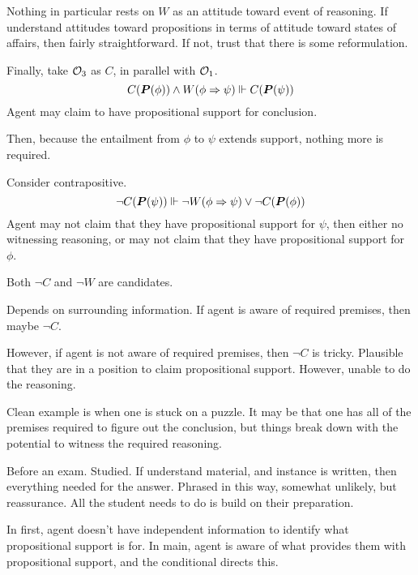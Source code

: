 \begin{note}[\(W\) is an attitude?]
  Nothing in particular rests on \(W\) as an attitude toward event of reasoning.
  If understand attitudes toward propositions in terms of attitude toward states of affairs, then fairly straightforward.
  If not, trust that there is some reformulation.
\end{note}

\begin{note}[\(\geop{3}\)]
  Finally, take \(\geop{3}\) as \(C\), in parallel with \(\mathcal{O}_{1}\).
  \[C(\bm{P}(\phi)) \land W(\phi \Rightarrow{} \psi) \Vdash C(\bm{P}(\psi))\]
  Agent may claim to have propositional support for conclusion.
\end{note}

\begin{note}[Contraposing]
  Then, because the entailment from \(\phi\) to \(\psi\) extends support, nothing more is required.

  Consider contrapositive.
  \[\lnot C(\bm{P}(\psi)) \Vdash  \lnot W(\phi \Rightarrow{} \psi) \lor \lnot C(\bm{P}(\phi))\]
  Agent may not claim that they have propositional support for \(\psi\), then either no witnessing reasoning, or may not claim that they have propositional support for \(\phi\).

  Both \(\lnot C\) and \(\lnot W\) are candidates.

  Depends on surrounding information.
  If agent is aware of required premises, then maybe \(\lnot C\).

  However, if agent is not aware of required premises, then \(\lnot C\) is tricky.
  Plausible that they are in a position to claim propositional support.
  However, unable to do the reasoning.

  Clean example is when one is stuck on a puzzle.
  It may be that one has all of the premises required to figure out the conclusion, but things break down with the potential to witness the required reasoning.
\end{note}

\newpage

\begin{note}
  Before an exam.
  Studied.
  If understand material, and instance is written, then everything needed for the answer.
  Phrased in this way, somewhat unlikely, but reassurance.
  All the student needs to do is build on their preparation.

  In first, agent doesn't have independent information to identify what propositional support is for.
  In main, agent is aware of what provides them with propositional support, and the conditional directs this.
\end{note}

